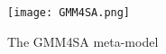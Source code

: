 \begin{figure}
\centering
\texttt{[image: GMM4SA.png]}
\caption{The GMM4SA meta-model}

\label{figure:GMM4SA}
\end{figure}